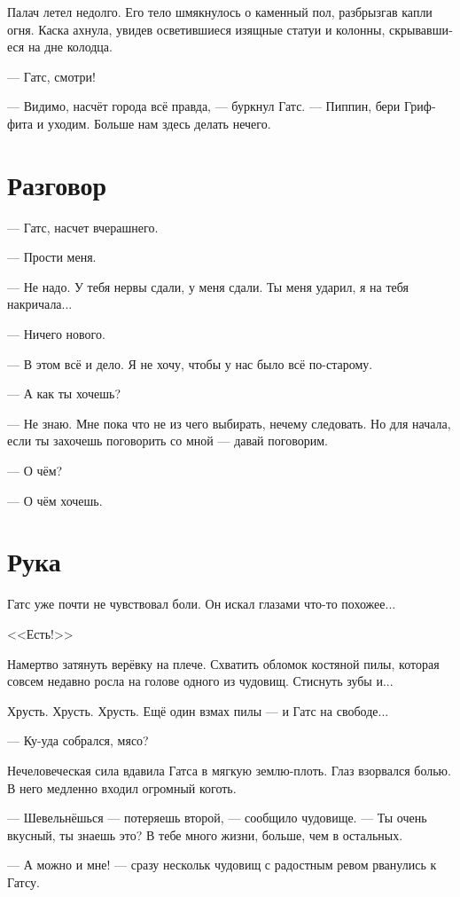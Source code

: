 \documentclass[a4paper,12pt,fleqn]{book}\usepackage{polyglossia}\setdefaultlanguage[babelshorthands=true]{russian}\setotherlanguage{english}\defaultfontfeatures{Ligatures=TeX,Mapping=tex-text}\usepackage{xcolor}\newcommand{\ml}[3]{#2}
\begin{document}
Палач летел недолго.
Его тело шмякнулось о каменный пол, разбрызгав капли огня.
Каска ахнула, увидев осветившиеся изящные статуи и колонны, скрывавшиеся на дне колодца.

--- Гатс, смотри!

--- Видимо, насчёт города всё правда, --- буркнул Гатс.
--- Пиппин, бери Гриффита и уходим.
Больше нам здесь делать нечего.

\section{Разговор}

--- Гатс, насчет вчерашнего.

--- Прости меня.

--- Не надо.
У тебя нервы сдали, у меня сдали.
Ты меня ударил, я на тебя накричала...

--- Ничего нового.

--- В этом всё и дело.
Я не хочу, чтобы у нас было всё по-старому.

--- А как ты хочешь?

--- Не знаю.
Мне пока что не из чего выбирать, нечему следовать.
Но для начала, если ты захочешь поговорить со мной --- давай поговорим.

--- О чём?

--- О чём хочешь.

\section{Рука}

Гатс уже почти не чувствовал боли.
Он искал глазами что-то похожее...

<<Есть!>>

Намертво затянуть верёвку на плече.
Схватить обломок костяной пилы, которая совсем недавно росла на голове одного из чудовищ.
Стиснуть зубы и...

Хрусть.
Хрусть.
Хрусть.
Ещё один взмах пилы --- и Гатс на свободе...

--- Ку-уда собрался, мясо?

Нечеловеческая сила вдавила Гатса в мягкую землю-плоть.
Глаз взорвался болью.
В него медленно входил огромный коготь.

--- Шевельнёшься --- потеряешь второй, --- сообщило чудовище.
--- Ты очень вкусный, ты знаешь это?
В тебе много жизни, больше, чем в остальных.

--- А можно и мне! --- сразу нескольк чудовищ с радостным ревом рванулись к Гатсу.
\end{document}
